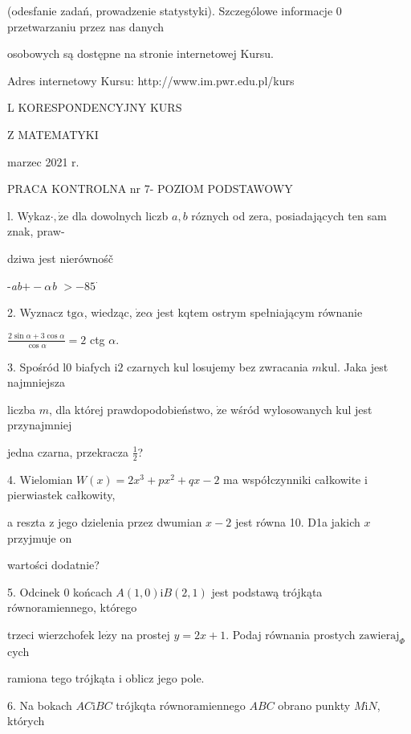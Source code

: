 \documentclass[a4paper,12pt]{article}
\begin{document}
(odesfanie zadań, prowadzenie statystyki). Szczególowe informacje $0$ przetwarzaniu przez nas danych

osobowych są dostępne na stronie internetowej Kursu.

Adres internetowy Kursu: http://www.im.pwr.edu.pl/kurs







L KORESPONDENCYJNY KURS

Z MATEMATYKI

marzec 2021 r.

PRACA KONTROLNA nr 7- POZIOM PODSTAWOWY

l. Wykaz$\cdot, \dot{\mathrm{z}}\mathrm{e}$ dla dowolnych liczb $a, b$ róznych od zera, posiadających ten sam znak, praw-

dziwa jest nierównośč

-{\it ab}$+-\alpha${\it b} $> -85^{\cdot}$

2. Wyznacz $\mathrm{t}\mathrm{g}\alpha$, wiedząc, $\dot{\mathrm{z}}\mathrm{e}\alpha$ jest kqtem ostrym spełniającym równanie

$\displaystyle \frac{2\sin\alpha+3\cos\alpha}{\cos\alpha}=2$ ctg $\alpha.$

3. Spośród l0 biafych $\mathrm{i}2$ czarnych kul losujemy bez zwracania $m\mathrm{k}\mathrm{u}\mathrm{l}$. Jaka jest najmniejsza

liczba $m$, dla której prawdopodobieństwo, $\dot{\mathrm{z}}\mathrm{e}$ wśród wylosowanych kul jest przynajmniej

jedna czarna, przekracza $\displaystyle \frac{1}{2}$?

4. Wielomian $W(x)=2x^{3}+px^{2}+qx-2$ ma współczynniki całkowite $\mathrm{i}$ pierwiastek całkowity,

a reszta $\mathrm{z}$ jego dzielenia przez dwumian $x-2$ jest równa 10. D1a jakich $x$ przyjmuje on

wartości dodatnie?

5. Odcinek $0$ końcach $A(1,0) \mathrm{i}B(2,1)$ jest podstawą trójkąta równoramiennego, którego

trzeci wierzchofek $\mathrm{l}\mathrm{e}\dot{\mathrm{z}}\mathrm{y}$ na prostej $y=2x+1$. Podaj równania prostych $\mathrm{z}\mathrm{a}\mathrm{w}\mathrm{i}\mathrm{e}\mathrm{r}\mathrm{a}\mathrm{j}_{\Phi}$cych

ramiona tego trójkąta $\mathrm{i}$ oblicz jego pole.

6. Na bokach $AC\mathrm{i}BC$ trójkqta równoramiennego $ABC$ obrano punkty $M\mathrm{i}N$, których
\end{document}
